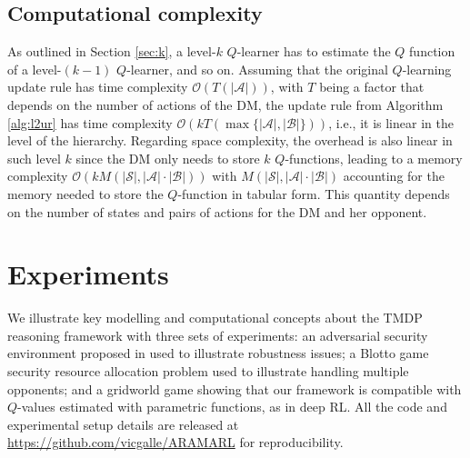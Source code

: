 \subsection{Computational complexity}\label{sec:cc}

As outlined in Section \ref{sec:k}, a level-$k$ $Q$-learner has to estimate the $Q$ function
of a level-$(k-1)$ $Q$-learner, and so on. Assuming that the original $Q$-learning 
update rule has time complexity $\mathcal{O}(T(|\mathcal{A}|))$, with $T$ being a factor that depends on the number of actions of the DM, the update rule from 
Algorithm \ref{alg:l2ur} has time complexity $\mathcal{O}(kT(\max \lbrace |\mathcal{A}|,  |\mathcal{B}|\rbrace))$, i.e.,
it is linear in the level of the hierarchy. %
Regarding space complexity, the overhead is also linear in such level $k$ since the DM only needs to store $k$ $Q$-functions, leading to a memory complexity $\mathcal{O}(kM(|\mathcal{S}|,|\mathcal{A}| \cdot |\mathcal{B}|))$ with $M(|\mathcal{S}|,|\mathcal{A}| \cdot |\mathcal{B}|)$ accounting for the memory needed to store the $Q$-function in tabular form. This quantity depends on the number of states and pairs of actions for the DM and her opponent.



\section{Experiments}\label{sec:exps_ararl}

We illustrate key modelling and computational concepts 
about the TMDP reasoning framework with three
sets of experiments:
an adversarial security environment proposed in \parencite{leike2017ai}
used to illustrate robustness issues; a Blotto game security resource allocation problem
used to illustrate handling multiple opponents; and a %
gridworld game showing that our framework is compatible with $Q$-values estimated with parametric functions, as in deep RL. %
All the code and experimental setup details
are released at \url{https://github.com/vicgalle/ARAMARL}
 for reproducibility.

